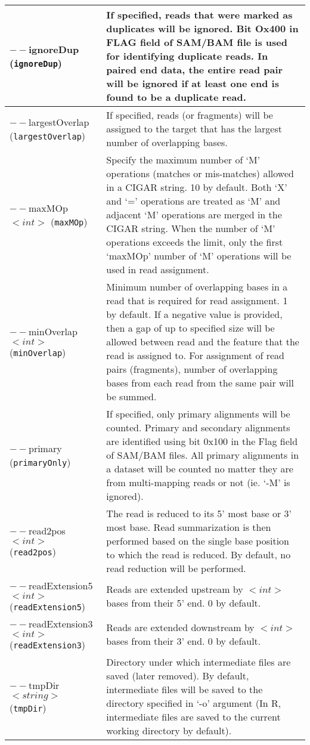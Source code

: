 \documentclass[12pt]{report}
\newcommand{\code}[1]{{\small\texttt{#1}}}
\newcommand{\R}{\textsf{R}}
\begin{document}
\begin{longtable}{|p{5cm}|p{11cm}|}
\hline
$--$ignoreDup \newline (\code{ignoreDup}) & If specified, reads that were marked as duplicates will be ignored. Bit Ox400 in FLAG field of SAM/BAM file is used for identifying duplicate reads. In paired end data, the entire read pair will be ignored if at least one end is found to be a duplicate read.\\
\hline
$--$largestOverlap \newline (\code{largestOverlap}) & If specified, reads (or fragments) will be assigned to the target that has the largest number of overlapping bases.\\
\hline
$--$maxMOp $<int>$ \newline (\code{maxMOp}) & Specify the maximum number of `M' operations (matches or mis-matches) allowed in a CIGAR string. 10 by default. Both `X' and `=' operations are treated as `M' and adjacent `M' operations are merged in the CIGAR string. When the number of `M' operations exceeds the limit, only the first `maxMOp' number of `M' operations will be used in read assignment.\\
\hline
$--$minOverlap $<int>$ \newline (\code{minOverlap}) & Minimum number of overlapping bases in a read that is required for read assignment. 1 by default. If a negative value is provided, then a gap of up to specified size will be allowed between read and the feature that the read is assigned to. For assignment of read pairs (fragments), number of overlapping bases from each read from the same pair will be summed. \\
\hline
$--$primary \newline (\code{primaryOnly}) & If specified, only primary alignments will be counted. Primary and secondary alignments are identified using bit 0x100 in the Flag field of SAM/BAM files. All primary alignments in a dataset will be counted no matter they are from multi-mapping reads or not (ie. `-M' is ignored).\\
\hline
$--$read2pos $<int>$ \newline (\code{read2pos}) & The read is reduced to its 5' most base or 3' most base. Read summarization is then performed based on the single base position to which the read is reduced. By default, no read reduction will be performed.\\
\hline
$--$readExtension5 $<int>$ \newline (\code{readExtension5}) & Reads are extended upstream by $<int>$ bases from their 5' end. 0 by default.\\
\hline
$--$readExtension3 $<int>$ \newline (\code{readExtension3}) & Reads are extended downstream by $<int>$ bases from their 3' end. 0 by default.\\
\hline
$--$tmpDir $<string>$ \newline (\code{tmpDir}) & Directory under which intermediate files are saved (later removed). By default, intermediate files will be saved to the directory specified in `-o' argument (In \R, intermediate files are saved to the current working directory by default).\\
\hline
\end{longtable}
\end{document}
